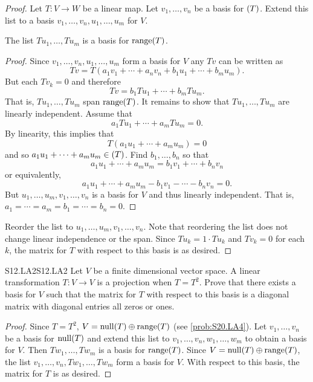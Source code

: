 \documentclass[../AlgebraQualSolutions.tex]{subfiles}
\begin{document}
	\begin{proof}
		Let $T: V \to W$ be a linear map. Let $v_1,\ldots, v_n$ be a basis for $\null(T)$. Extend this list to a basis $v_1,\ldots, v_n,u_1,\ldots,u_m$ for $V$.

		\begin{claim}
			The list $Tu_1,\ldots, Tu_m$ is a basis for $\mathrm{range}(T)$.

			\begin{proof}
				Since $v_1,\ldots, v_n,u_1,\ldots, u_m$ form a basis for $V$ any $Tv$ can be written as 
					\[Tv = T(a_1v_1 + \cdots + a_nv_n + b_1u_1 + \cdots + b_mu_m).\]
				But each $Tv_k = 0$ and therefore
					\[Tv = b_1Tu_1 + \cdots + b_mTu_m.\]
				That is, $Tu_1,\ldots, Tu_m$ span $\mathrm{range}(T)$. It remains to show that $Tu_1,\ldots, Tu_m$ are linearly independent. Assume that 
					\[a_1Tu_1 + \cdots + a_mTu_m = 0.\]
				By linearity, this implies that
					\[T(a_1u_1 + \cdots + a_mu_m) = 0\]
				and so $a_1u_1 + \cdots + a_mu_m \in \null(T)$. Find $b_1,\ldots, b_n$ so that
					\[a_1u_1 + \cdots + a_mu_m = b_1v_1 + \cdots + b_nv_n\]
				or equivalently,
				\[a_1u_1 + \cdots + a_mu_m - b_1v_1 - \cdots - b_nv_n = 0.\]
				But $u_1,\ldots,u_m,v_1,\ldots,v_n$ is a basis for $V$ and thus linearly independent. That is, $a_1 = \cdots = a_m = b_1 = \cdots = b_n = 0$.
			\end{proof}
		\end{claim}

		Reorder the list to $u_1,\ldots,u_m,v_1,\ldots, v_n$. Note that reordering the list does not change linear independence or the span. Since $Tu_k = 1\cdot Tu_k$ and $Tv_k = 0$ for each $k$, the matrix for $T$ with respect to this basis is as desired.
	\end{proof}

	\begin{prob}{S12.LA2}{S12.LA2}
		Let $V$ be a finite dimensional vector space. A linear transformation $T: V \to V$ is a projection when $T = T^2$. Prove that there exists a basis for $V$ such that the matrix for $T$ with respect to this basis is a diagonal matrix with diagonal entries all zeros or ones.
	\end{prob}

	\begin{proof}
		Since $T = T^2$, $V = \mathrm{null}(T) \oplus \mathrm{range}(T)$ (see \ref{prob:S20.LA4}). Let $v_1,\ldots, v_n$ be a basis for $\mathrm{null}(T)$ and extend this list to $v_1,\ldots, v_n, w_1,\ldots,w_m$ to obtain a basis for $V$. Then $Tw_1,\ldots, Tw_m$ is a basis for $\mathrm{range}(T)$. Since $V = \mathrm{null}(T) \oplus \mathrm{range}(T)$, the list $v_1,\ldots, v_n, Tw_1,\ldots, Tw_m$ form a basis for $V$. With respect to this basis, the matrix for $T$ is as desired.
	\end{proof}
\end{document}
